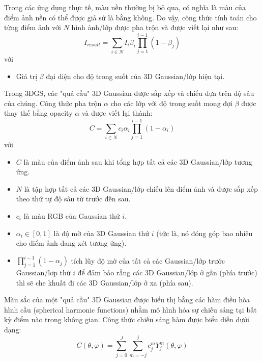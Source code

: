         Trong các ứng dụng thực tế, màu nền thường bị bỏ qua, có nghĩa là màu của điểm ảnh nền có thể được giả sử là bằng không. Do vậy, công thức tính toán cho từng điểm ảnh với $N$ hình ảnh/lớp được pha trộn và được viết lại như sau:
        $$I_{result} = \sum_{i \in N}I_i\beta_i \prod^{i-1}_{j=1}(1-\beta_j)$$
        với
        \begin{itemize}
            \item Giá trị $ \beta $ đại diện cho độ trong suốt của 3D Gaussian/lớp hiện tại.
        \end{itemize}

        Trong 3DGS, các "quả cầu" 3D Gaussian được sắp xếp và chiếu dựa trên độ sâu của chúng. Công thức pha trộn $ \alpha $ cho các lớp với độ trong suốt mong đợi $ \beta $ được thay thế bằng opacity $ \alpha $ và được viết lại thành:
        $$C = \sum_{i \in N } c_i \alpha_i \prod^{i-1}_{j=1}(1-\alpha_i)$$
        với
        \begin{itemize}
            \item $C$ là màu của điểm ảnh sau khi tổng hợp tất cả các 3D Gaussian/lớp tương ứng.
            \item $N$ là tập hợp tất cả các 3D Gaussian/lớp chiếu lên điểm ảnh và được sắp xếp theo thứ tự độ sâu từ trước đến sau.
            \item $c_i$ là màu RGB của Gaussian thứ $ i $.
            \item $\alpha_i \in [0,1]$ là độ mờ của 3D Gaussian thứ $i$  (tức là, nó đóng góp bao nhiêu cho điểm ảnh đang xét tương ứng).
            \item $\prod_{j=1}^{i-1}(1-\alpha_j)$ tích lũy độ mờ của tất cả các Gaussian/lớp trước Gaussian/lơp thứ $i$ để đảm bảo rằng các 3D Gaussian/lớp ở gần (phía trước) thì sẽ che khuất đi các 3D Gaussian/lớp ở xa (phía sau).
        \end{itemize}

        Màu sắc của một "quả cầu" 3D Gaussian được biểu thị bằng các hàm điều hòa hình cầu (spherical harmonic functions) nhằm mô hình hóa sự chiếu sáng tại bất kỳ điểm nào trong không gian. Công thức chiếu sáng hàm được biểu diễn dưới dạng:
        $$C(\theta, \varphi) = \sum_{j=0}^J\sum^j_{m=-j}c_j^mY_j^m(\theta, \varphi)$$

